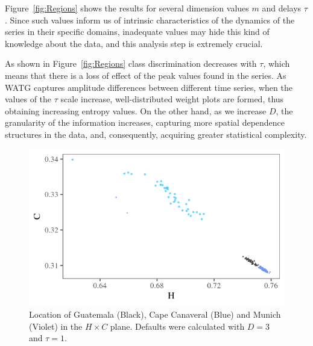 \documentclass{isprs}
\begin{document}
Figure~\ref{fig:Regions} shows the results for several dimension values $m$ and delays $\tau$.
Since such values inform us of intrinsic characteristics of the dynamics of the series in their specific domains, inadequate values may hide this kind of knowledge about the data, and this analysis step is extremely crucial.

As shown in Figure~\ref{fig:Regions} class discrimination decreases with $\tau$, which means that there is a loss of effect of the peak values found in the series.
As WATG captures amplitude differences between different time series, when the values of the $\tau$ scale increase, well-distributed weight plots are formed, thus obtaining increasing entropy values.
On the other hand, as we increase $D$, the granularity of the information increases, capturing more spatial dependence structures in the data, and, consequently, acquiring greater statistical complexity.

\begin{figure}[hbt]
	\centering
	\includegraphics[width=0.9\columnwidth]{Figures/transitionGraphD3t1.png}
	\caption{Location of Guatemala (Black), Cape Canaveral (Blue) and Munich (Violet) in the $H \times C$ plane. Defaults were calculated with $D = 3$ and $\tau = 1$.}
	\label{fig:D3T1}
\end{figure}
\end{document}
